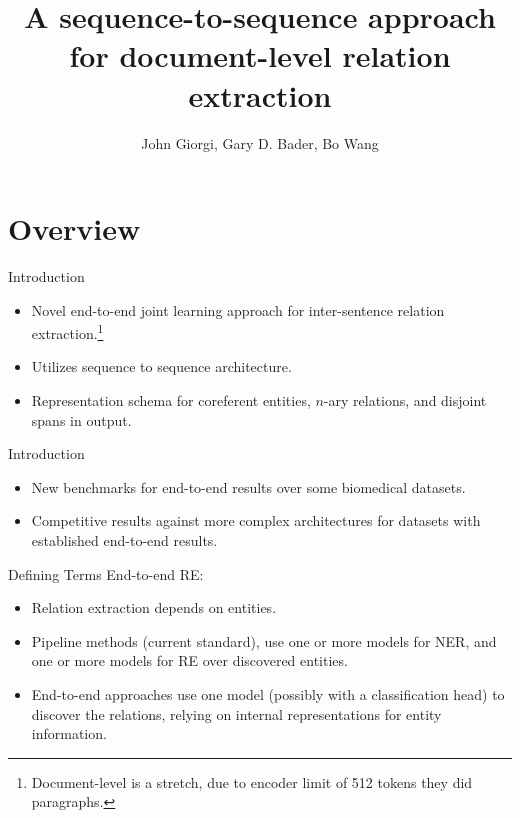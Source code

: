 \documentclass[usenames,dvipsnames,pdf]{beamer}
\title{A sequence-to-sequence approach for document-level relation extraction}
\author{John Giorgi, Gary D. Bader, Bo Wang}
\begin{document}
	\begin{frame}
		\titlepage
	\end{frame}


        \section{Overview}

        \begin{frame}{Introduction}
          \begin{itemize}
          \item
            Novel end-to-end joint learning approach for inter-sentence relation extraction.\footnote{Document-level is a stretch, due to encoder limit of 512 tokens they did paragraphs.}
          \item
            Utilizes sequence to sequence architecture.
          \item
            Representation schema for coreferent entities, $n$-ary relations, and disjoint spans in output.
          \end{itemize}
        \end{frame}

        \begin{frame}{Introduction}
          \begin{itemize}
          \item
            New benchmarks for end-to-end results over some biomedical datasets.
          \item
            Competitive results against more complex architectures for datasets with established end-to-end results.
          \end{itemize}
        \end{frame}

        \begin{frame}{Defining Terms}
          End-to-end RE:
          \begin{itemize}
          \item
            Relation extraction depends on entities.
          \item
            Pipeline methods (current standard), use one or more models for NER, and one or more models for RE over discovered entities.
          \item
            End-to-end approaches use one model (possibly with a classification head) to discover the relations, relying on internal representations for entity information.
          \end{itemize}
        \end{frame}
\end{document}
